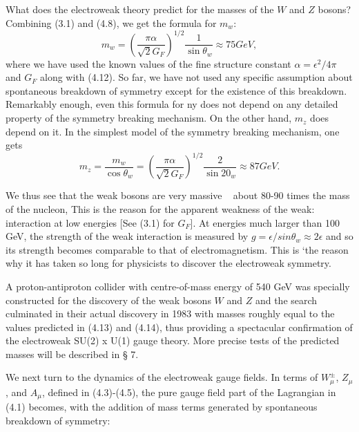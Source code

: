 What does the electroweak theory predict for the masses of the $W$ and $Z$ bosons? Combining (3.1) and (4.8), we get the formula for $m_{w}$: 
\begin{equation*}
m_{w} = \left(\frac{\pi \alpha}{\sqrt{2}G_{F}}\right)^{1/2} \frac{1}{\sin \theta_{w}} \approx 75 GeV,\tag{4.13}
\end{equation*}
where we have used the known values of the fine structure constant $\alpha =\epsilon^{2}/4\pi$ and $G_{F}$ along with (4.12). So far, we have not used any specific assumption about spontaneous breakdown of symmetry except for the existence of this breakdown. Remarkably enough, even this formula for ny does not depend on any detailed property of the symmetry breaking mechanism. On the other hand, $m_{z}$ does depend on it. In the simplest model of the symmetry breaking mechanism, one gets 
\begin{equation*}
m_{z}= \frac{m_{w}}{\cos \theta_{w}} = \left(\frac{\pi \alpha}{\sqrt{2}G_{F}} \right)^{1/2} \frac{2}{\sin 20_{w}}\approx 87 GeV.\tag{4.14}
\end{equation*}

We thus see that the weak bosons are very massive ~ about 80-90 times the mass of the nucleon, This is the reason for the apparent weakness of the weak: interaction at low energies [See (3.1) for $G_{F}$]. At energies much larger than 100 GeV, the strength of the weak interaction is measured by $g = \epsilon/sin \theta_{w} \approx 2\epsilon$ and so its strength becomes comparable to that of electromagnetism. This is ‘the reason why it has taken so long for physicists to discover the electroweak symmetry. 

A proton-antiproton collider with centre-of-mass energy of 540 GeV was specially constructed for the discovery of the weak bosons $W$ and $Z$ and the search culminated in their actual discovery in 1983 with masses roughly equal to the values predicted in (4.13) and (4.14), thus providing a spectacular confirmation of the electroweak SU(2) x U(1) gauge theory. More precise tests of the predicted masses will be described in § 7.

We next turn to the dynamics of the electroweak gauge fields. In terms of $W^{\pm}_{\mu}$, $Z_{\mu}$, and $A_{\mu}$, defined in (4.3)-(4.5), the pure gauge field part of the Lagrangian in (4.1) becomes, with the addition of mass terms generated by spontaneous breakdown of symmetry: 

